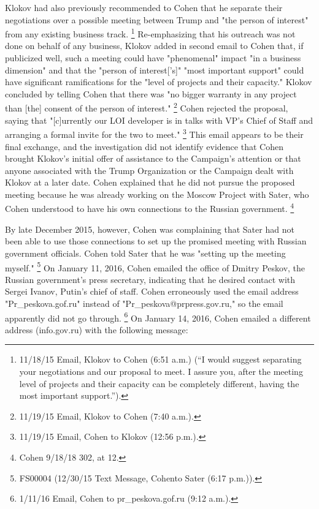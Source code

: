 Klokov had also previously recommended to Cohen that he separate their negotiations over a possible meeting between Trump and "the person of interest" from any existing business track.%
\footnote{11/18/15 Email, Klokov to Cohen (6:51 a.m.) (“I would suggest separating your negotiations and our proposal to meet.
I assure you, after the meeting level of projects and their capacity can be completely different, having the most important support.”).}
Re-emphasizing that his outreach was not done on behalf of any business, Klokov added in second email to Cohen that, if publicized well, such a meeting could have "phenomenal" impact "in a business dimension" and that the "person of interest['s]" "most important support" could have significant ramifications for the "level of projects and their capacity."
Klokov concluded by telling Cohen that there was "no bigger warranty in any project than [the] consent of the person of interest."%
\footnote{11/19/15 Email, Klokov to Cohen (7:40 a.m.).}
Cohen rejected the proposal, saying that "[c]urrently our LOI developer is in talks with VP's Chief of Staff and arranging a formal invite for the two to meet."%
\footnote{11/19/15 Email, Cohen to Klokov (12:56 p.m.).}
This email appears to be their final exchange, and the investigation did not identify evidence that Cohen brought Klokov's initial offer of assistance to the Campaign's attention or that anyone associated with the Trump Organization or the Campaign dealt with Klokov at a later date.
Cohen explained that he did not pursue the proposed meeting because he was already working on the Moscow Project with Sater, who Cohen understood to have his own connections to the Russian government.%
\footnote{Cohen 9/18/18 302, at 12.}

By late December 2015, however, Cohen was complaining that Sater had not been able to use those connections to set up the promised meeting with Russian government officials.
Cohen told Sater that he was "setting up the meeting myself."%
\footnote{FS00004 (12/30/15 Text Message, Cohento Sater (6:17 p.m.)).}
On January 11, 2016, Cohen emailed the office of Dmitry Peskov, the Russian government's press secretary, indicating that he desired contact with Sergei Ivanov, Putin's chief of staff.
Cohen erroneously used the email address "Pr\_peskova\@prpress.gof.ru" instead of "Pr\_peskova@prpress.gov.ru," so the email apparently did not go through.%
\footnote{1/11/16 Email, Cohen to pr\_peskova\@prpress.gof.ru (9:12 a.m.).}
On January 14, 2016, Cohen emailed a different address (info\@prpress.gov.ru) with the following message:

